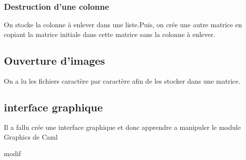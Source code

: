 \documentclass{article}
\begin{document}
\subsubsection{Destruction d'une colonne}

On stocke la colonne à enlever dans une liste.Puis, on crée une autre matrice en copiant la matrice initiale dans cette matrice sans la colonne à enlever.
 
\subsection{Ouverture d'images}

On a lu les fichiers caractère par caractère afin de les stocker dans une matrice. 


\subsection{interface graphique}
Il a fallu crée une interface graphique et donc apprendre a manipuler le module Graphics de Caml

modif
\end{document}
